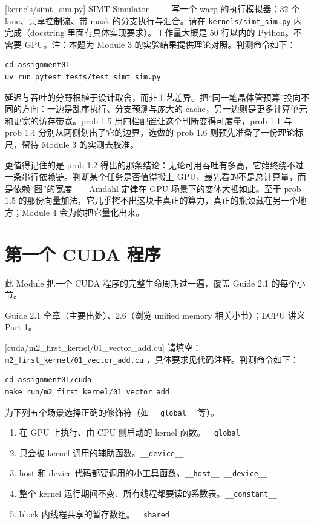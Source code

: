 \documentclass[11pt,a4paper,fontset=none]{ctexart}
\begin{document}
[kernels/simt\_sim.py]
SIMT Simulator —— 写一个 warp 的执行模拟器：32 个 lane、共享控制流、带 mask 的分支执行与汇合。请在 \texttt{kernels/simt\_sim.py} 内完成（docstring 里面有具体实现要求）。工作量大概是 50 行以内的 Python。不需要 GPU。注：本题为 Module 3 的实验结果提供理论对照。判测命令如下：

\begin{lstlisting}
cd assignment01
uv run pytest tests/test_simt_sim.py
\end{lstlisting}

\begin{lookback}
  延迟与吞吐的分野根植于设计取舍，而非工艺差异。把“同一笔晶体管预算”投向不同的方向：一边是乱序执行、分支预测与庞大的 cache，另一边则是更多计算单元和更宽的访存带宽。prob 1.5 用四档配置让这个判断变得可度量，prob 1.1 与 prob 1.4 分别从两侧划出了它的边界，选做的 prob 1.6 则预先准备了一份理论标尺，留待 Module 3 的实测去校准。

  更值得记住的是 prob 1.2 得出的那条结论：无论可用吞吐有多高，它始终绕不过一条串行依赖链。判断某个任务是否值得搬上 GPU，最先看的不是总计算量，而是依赖“图”的宽度——Amdahl 定律在 GPU 场景下的变体大抵如此。至于 prob 1.5 的那份向量加法，它几乎榨不出这块卡真正的算力，真正的瓶颈藏在另一个地方；Module 4 会为你把它量化出来。
\end{lookback}

\section{第一个 CUDA 程序}

此 Module 把一个 CUDA 程序的完整生命周期过一遍，覆盖 Guide 2.1 的每个小节。

\begin{reading}
  Guide 2.1 全章（主要出处）、2.6（浏览 unified memory 相关小节）；LCPU 讲义 Part 1。
\end{reading}

[cuda/m2\_first\_kernel/01\_vector\_add.cu]
请填空：\texttt{m2\_first\_kernel/01\_vector\_add.cu} ，具体要求见代码注释。判测命令如下：

\begin{lstlisting}
cd assignment01/cuda
make run/m2_first_kernel/01_vector_add
\end{lstlisting}

为下列五个场景选择正确的修饰符（如 \texttt{\_\_global\_\_} 等）。
\begin{enumerate}[label=(\alph*)]
  \item 在 GPU 上执行、由 CPU 侧启动的 kernel 函数。\texttt{\_\_global\_\_}
  \item 只会被 kernel 调用的辅助函数。\texttt{\_\_device\_\_}
  \item host 和 device 代码都要调用的小工具函数。\texttt{\_\_host\_\_ \_\_device\_\_}
  \item 整个 kernel 运行期间不变、所有线程都要读的系数表。\texttt{\_\_constant\_\_}
  \item block 内线程共享的暂存数组。\texttt{\_\_shared\_\_}
\end{enumerate}
\end{document}
